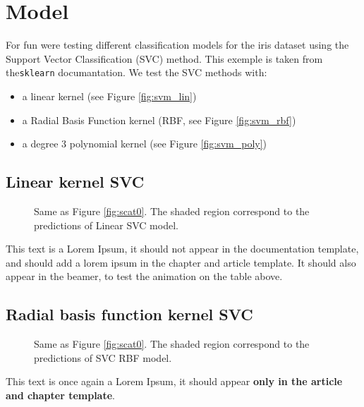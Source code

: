 \section{Model}\label{model}

For fun were testing different classification models for the iris
dataset using the Support Vector Classification (SVC) method. This
exemple is taken from the\texttt{sklearn} documantation. We test the SVC
methods with:

\begin{itemize}
\tightlist
\item
  a linear kernel (see Figure \ref{fig:svm_lin})
\item
  a Radial Basis Function kernel (RBF, see Figure \ref{fig:svm_rbf})
\item
  a degree 3 polynomial kernel (see Figure \ref{fig:svm_poly})
\end{itemize}



\subsection{Linear kernel SVC}\label{linear-kernel-svc}

\begin{figure}

\centering
{}

\caption{Same as Figure \ref{fig:scat0}. The shaded region correspond to the predictions of Linear SVC model.}
\end{figure}
This text is a Lorem Ipsum, it should not appear in the documentation
template, and should add a lorem ipsum in the chapter and article
template. It should also appear in the beamer, to test the animation on
the table above.\par
\lipsum[7-8]

\subsection{Radial basis function kernel
SVC}\label{radial-basis-function-kernel-svc}

\begin{figure}

\centering
{}

\caption{Same as Figure \ref{fig:scat0}. The shaded region correspond to the predictions of SVC RBF model.}
\end{figure}
This text is once again a Lorem Ipsum, it should appear \textbf{only in
the article and chapter template}.\par
\lipsum[9-10]

